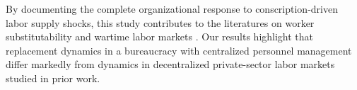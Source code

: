 By documenting the complete organizational response to conscription-driven labor supply shocks, this study contributes to the literatures on worker substitutability \citep{JaegerDeath} and wartime labor markets \citep{Acemoglu, 101221}. Our results highlight that replacement dynamics in a bureaucracy with centralized personnel management differ markedly from dynamics in decentralized private-sector labor markets studied in prior work.
